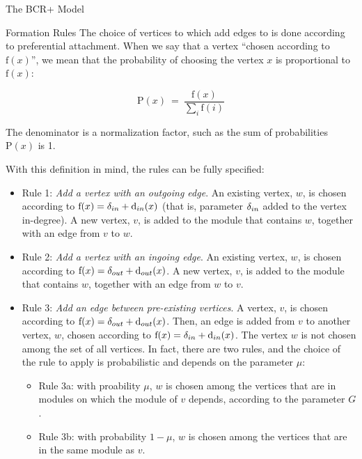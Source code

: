 \documentclass[11pt,twocolumn,a4paper,english]{article}
\begin{document}
\begin{section}{The BCR+ Model}
\begin{subsection}{Formation Rules}
	The choice of vertices to which add edges to is done according to preferential attachment. When we say that a vertex ``chosen according to $\mathrm{f}(x)$'', we mean that the probability of choosing the vertex $x$ is proportional to $\mathrm{f}(x)$:
	
	$$
	  \mathrm{P}(x) ~=~ \frac{ \mathrm{f}(x) }
	  { \displaystyle\sum_{i} \mathrm{f}(i) }
	$$
	
	The denominator is a normalization factor, such as the sum of probabilities $\mathrm{P}(x)$ is 1.
	
	With this definition in mind, the rules can be fully specified:
	
	\begin{itemize}
		\item Rule 1: \emph{Add a vertex with an outgoing edge}. An existing vertex, $w$, is chosen according to $\mathrm{f}(x) = \delta_{in} + \mathrm{d}_{in}(x)$ (that is, parameter $\delta_{in}$ added to the vertex in-degree). A new vertex, $v$, is added to the module that contains $w$, together with an edge from $v$ to $w$.

		\item Rule 2: \emph{Add a vertex with an ingoing edge}. An existing vertex, $w$, is chosen according to $\mathrm{f}(x) = \delta_{out} + \mathrm{d}_{out}(x)$. A new vertex, $v$, is added to the module that contains $w$, together with an edge from $w$ to $v$.

		\item Rule 3: \emph{Add an edge between pre-existing vertices}. A vertex, $v$, is chosen according to $\mathrm{f}(x) = \delta_{out} + \mathrm{d}_{out}(x)$. Then, an edge is added from $v$ to another vertex, $w$, chosen according to $\mathrm{f}(x) = \delta_{in} + \mathrm{d}_{in}(x)$. The vertex $w$ is not chosen among the set of all vertices. In fact, there are two rules, and the choice of the rule to apply is probabilistic and depends on the parameter $\mu$:

		\begin{itemize}
		  \item Rule 3a: with proability $\mu$, $w$ is chosen among the vertices that are in modules on which the module of $v$ depends, according to the parameter $G$.
		  \item Rule 3b: with probability $1 - \mu$, $w$ is chosen among the vertices that are in the same module as $v$.
		\end{itemize}
	\end{itemize}
		
\end{subsection}


\end{section}
\end{document}
